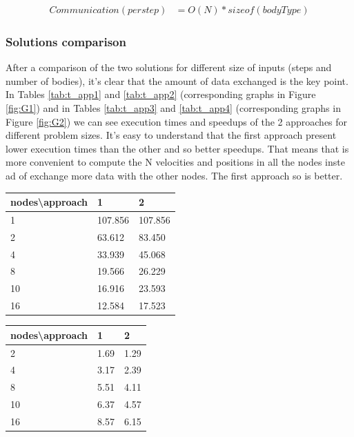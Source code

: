 \documentclass[a4paper]{article}
\begin{document}
\begin{equation} \label{eq:com_app2}
\begin{split}
Communication (per step) & = O(N)*sizeof(bodyType)
\end{split}
\end{equation}


\subsubsection{Solutions comparison}
\label{sec:sol_comp}
After a comparison of the two solutions for different size of inputs (steps and number of bodies), it's clear that the amount of data exchanged is the key point. In Tables \ref{tab:t_app1} and \ref{tab:t_app2} (corresponding graphs in Figure \ref{fig:G1}) and in Tables \ref{tab:t_app3} and \ref{tab:t_app4} (corresponding graphs in Figure \ref{fig:G2}) we can see execution times and speedups of the 2 approaches for different problem sizes. It's easy to understand that the first approach present lower execution times than the other and so better speedups. That means that is more convenient to compute the N velocities and positions in all the nodes inste ad of exchange more data with the other nodes. The first approach so is better.
\\


\begin{minipage}[b]{.40\textwidth}
  \centering
  \begin{tabular}{l|l|l}
  \centering
nodes\textbackslash approach & 1 & 2 \\ \hline
1 & 107.856 & 107.856 \\ \hline
2 & 63.612 & 83.450 \\ \hline
4 & 33.939 & 45.068 \\ \hline
8 & 19.566 & 26.229 \\ \hline
10 & 16.916 & 23.593 \\ \hline
16 & 12.584 & 17.523 \\ 
    \hline
  \end{tabular}
  \label{tab:t_app1}
\end{minipage} \qquad
\begin{minipage}[b]{.40\textwidth}
  \centering
  \begin{tabular}{l|l|l}
nodes\textbackslash approach & 1 & 2 \\ \hline
2 & 1.69 & 1.29 \\ \hline
4 & 3.17 & 2.39 \\ \hline
8 & 5.51 & 4.11 \\ \hline
10 & 6.37 & 4.57 \\ \hline
16 & 8.57 & 6.15 \\ 
  \hline
  \end{tabular}
  \label{tab:t_app2}
\end{minipage}
\end{document}
